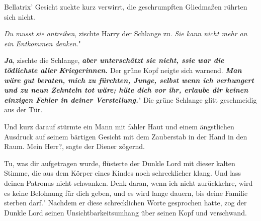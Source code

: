 Bellatrix' Gesicht zuckte kurz verwirrt, die geschrumpften Gliedmaßen rührten
sich nicht.

\glqq{}\emph{Du musst sie antreiben}\grqq{}, zischte Harry der Schlange zu. \glqq{}
\emph{Sie kann nicht mehr an ein Entkommen denken}."

\glqq{}\textbf{\emph{Ja}}\grqq{}, zischte die Schlange, \glqq{}\textbf{\emph{aber
unterschätzt sie nicht, ssie war die tödlichste aller
}}\textbf{\emph{Kriegerinnen.}}\grqq{} Der grüne Kopf neigte sich warnend. \glqq{}
\textbf{\emph{Man wäre gut beraten, mich zu fürchten, Junge, selbst wenn ich
verhungert und zu neun Zehnteln tot wäre; hüte dich vor ihr, erlaube dir keinen
einzigen Fehler in deiner Verstellung.}}" Die grüne Schlange glitt geschmeidig
aus der Tür.

Und kurz darauf stürmte ein Mann mit fahler Haut und einem ängstlichen Ausdruck
auf seinem bärtigen Gesicht mit dem Zauberstab in der Hand in den Raum. \glqq{}
Mein Herr?\grqq{}, sagte der Diener zögernd.

\glqq{}Tu, was dir aufgetragen wurde\grqq{}, flüsterte der Dunkle Lord mit dieser
kalten Stimme, die aus dem Körper eines Kindes noch schrecklicher klang. \glqq{}
Und lass deinen Patronus nicht schwanken. Denk daran, wenn ich nicht
zurückkehre, wird es keine Belohnung für dich geben, und es wird lange dauern,
bis deine Familie sterben darf." Nachdem er diese schrecklichen Worte gesprochen
hatte, zog der Dunkle Lord seinen Unsichtbarkeitsumhang über seinen Kopf und
verschwand.


